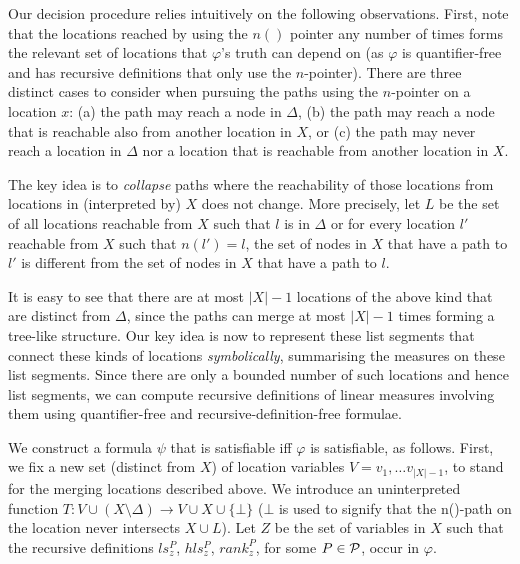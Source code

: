 Our decision procedure relies intuitively on the following observations. First, note that the locations
reached by using the $n()$ pointer any number of times forms the relevant set of locations that $\varphi$'s
truth can depend on (as $\varphi$ is quantifier-free and has recursive definitions that only use the $n$-pointer).
There are three distinct cases to consider when pursuing the paths using the $n$-pointer on a location $x$:
(a) the path may reach a node in $\Delta$, (b) the path may reach a node that is reachable also from another location in $X$,
or (c) the path may never reach a location in $\Delta$ nor a location that is reachable from another location in $X$. 

The key idea is to \emph{collapse} paths where the reachability of those locations from locations in (interpreted by) $X$ does not change.
More precisely, let $L$ be the set of all locations reachable from $X$ such that $l$ is in $\Delta$ or 
for every location $l'$ reachable from $X$ such that $n(l')=l$, the set of nodes in $X$ that have a path
to $l'$ is different from the set of nodes in $X$ that have a path to $l$.

It is easy to see that there are at most $|X|-1$ locations of the above kind that are distinct from $\Delta$,
since the paths can merge at most $|X|-1$ times forming a tree-like structure. Our key idea is now to 
represent these list segments that connect these kinds of locations \emph{symbolically}, summarising the 
measures on these list segments. Since there are only a bounded number of such locations and hence list
segments, we can compute recursive definitions of linear measures involving them using quantifier-free
and recursive-definition-free formulae.

We construct a formula $\psi$ that is satisfiable iff $\varphi$ is satisfiable, as follows.
First, we fix a new set (distinct from $X$) of location variables $V={v_1, \ldots v_{|X|-1}}$,
to stand for the merging locations described above.
We introduce an uninterpreted function $T: V \cup (X\setminus \Delta) \longrightarrow V \cup X \cup \{\bot\}$
($\bot$ is used to signify that the n()-path on the location never intersects $X \cup{} L$).
Let $Z$ be the set of variables in $X$ such that the recursive definitions $ls_z^P$, $hls_z^P$, $rank_z^P$, for some
$P \in {\cal P}$, occur in $\varphi$.

